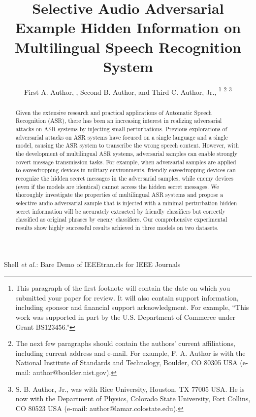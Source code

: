 \documentclass[journal]{IEEEtran}
\begin{document}
\title{Selective Audio Adversarial Example Hidden Information on Multilingual Speech Recognition System}

\author{First A. Author, , Second B. Author, and Third C. Author, Jr., 
\thanks{This paragraph of the first footnote will contain the date on which you submitted your paper for review. It will also contain support information, including sponsor and financial support acknowledgment. For example, ``This work was supported in part by the U.S. Department of Commerce under Grant BS123456.'' }
\thanks{The next few paragraphs should contain the authors' current affiliations, including current address and e-mail. For example, F. A. Author is with the National Institute of Standards and Technology, Boulder, CO 80305 USA (e-mail: author@boulder.nist.gov).}
\thanks{S. B. Author, Jr., was with Rice University, Houston, TX 77005 USA. He is now with the Department of Physics, Colorado State University, Fort Collins, CO 80523 USA (e-mail: author@lamar.colostate.edu).}}

{Shell \MakeLowercase{\textit{et al.}}: Bare Demo of IEEEtran.cls for IEEE Journals}
\maketitle

\begin{abstract}
Given the extensive research and practical applications of Automatic Speech Recognition (ASR), there has been an increasing interest in realizing adversarial attacks on ASR systems by injecting small perturbations. Previous explorations of adversarial attacks on ASR systems have focused on a single language and a single model, causing the ASR system to transcribe the wrong speech content. However, with the development of multilingual ASR systems, adversarial samples can enable strongly covert message transmission tasks. For example, when adversarial samples are applied to eavesdropping devices in military environments, friendly eavesdropping devices can recognize the hidden secret messages in the adversarial samples, while enemy devices (even if the models are identical) cannot access the hidden secret messages. We thoroughly investigate the properties of multilingual ASR systems and propose a selective audio adversarial sample that is injected with a minimal perturbation hidden secret information will be accurately extracted by friendly classifiers but correctly classified as original phrases by enemy classifiers. Our comprehensive experimental results show highly successful results achieved in three models on two datasets.
\end{abstract}
\end{document}
